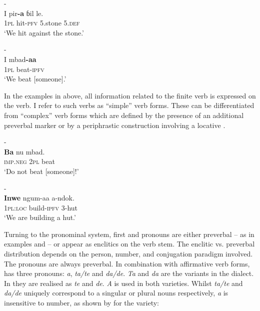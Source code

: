 \documentclass[output=paper,newtxmath,modfonts,nonflat,hidelinks]{langsci/langscibook}
\begin{document}
\ea\label{ex:apel:2} 
\ea\label{ex:apel:2a}{- \citep[193]{Faye1979}}\\
\gll I pir\textbf{-a} ɓil le. \\
     \textsc{1pl} hit-\textsc{pfv} 5.stone 5.\textsc{def}\\
\glt ‘We hit against the stone.’ 

\ex\label{ex:apel:2b} {- \citep[217]{Faye1979}}\\
\gll I mbad\textbf{-aa} \\
     \textsc{1pl} beat\textsc{-}\textsc{ipfv}   \\
\glt ‘We beat [someone].’
\z
\z

In the examples in  above, all information related to the finite verb is expressed on the verb. I refer to such verbs as “simple” verb forms. These can be differentiated from “complex” verb forms which are defined by the presence of an additional preverbal marker  or by a periphrastic construction involving a locative  .

\ea\label{ex:apel:3} 
\ea\label{ex:apel:3a}{- \citep[217]{Faye1979}}\\
\gll \textbf{Ba} nu mbad.\\
     \textsc{imp.neg} \textsc{2pl} beat\\
\glt ‘Do not beat [someone]!’ 

\ex\label{ex:apel:3b} {- \citep[248]{Faye1979}}\\
\gll \textbf{Inwe} ngum-aa a-ndok.\\
     1\textsc{pl:loc} build-\textsc{ipfv} 3-hut   \\
\glt  ‘We are building a hut.’
\z
\z

Turning to the pronominal system, first and   pronouns are either preverbal -- as in examples  and  -- or appear as enclitics on the verb stem. The enclitic vs. preverbal distribution depends on the person, number, and conjugation paradigm involved. The   pronouns are always preverbal. In combination with affirmative verb forms,  has three   pronouns: \textit{a}, \textit{ta/te} and \textit{da/de}. \textit{Ta} and \textit{da} are the variants in the  dialect. In  they are realised as \textit{te} and \textit{de}. \textit{A} is used in both varieties. Whilst \textit{ta/te} and \textit{da/de} uniquely correspond to a singular or plural nouns respectively, \textit{a} is insensitive to number, as shown by  for the  variety:
\end{document}
